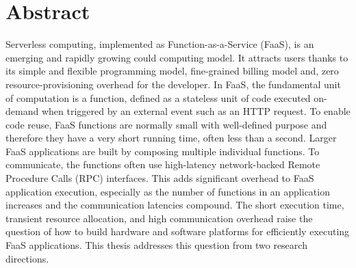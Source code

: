 \documentclass[../main.tex]{subfiles}
\begin{document}
\chapter{Abstract}


Serverless computing, implemented as Function-as-a-Service (FaaS), is
an emerging and rapidly growing could computing model. It attracts
users thanks to its simple and flexible programming model,
fine-grained billing model and, zero resource-provisioning overhead
for the developer. In FaaS, the fundamental unit of computation is a
function, defined as a stateless unit of code executed on-demand when
triggered by an external event such as an HTTP request. To enable
code reuse, FaaS functions are normally small with well-defined
purpose and therefore they have a very short running time, often less
than a second. Larger FaaS applications are built by composing
multiple individual functions. To communicate, the functions often use
high-latency network-backed Remote Procedure Calls (RPC)
interfaces. This adds significant overhead to FaaS application
execution, especially as the number of functions in an application
increases and the communication latencies compound. The short execution
time, transient resource allocation, and high communication overhead
raise the question of how to build hardware and software platforms
for efficiently executing FaaS applications. This thesis addresses
this question from two research directions.
\end{document}
